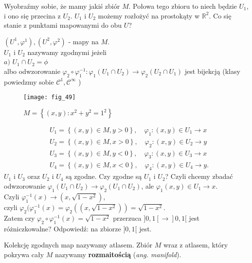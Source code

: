 \documentclass[../main.tex]{subfiles}
\begin{document}
Wyobraźmy sobie, że mamy jakiś zbiór $M$. Połowa tego zbioru to niech będzie $U_1$, i ono się przecina z $U_2$. $U_1$ i $U_2$ możemy rozłożyć na prostokąty w $\mathbb{R}^2$. Co się stanie z punktami mapowanymi do obu $U$?
\begin{definicja}
    $(U^1,\varphi^1), (U^2,\varphi^2)$ - mapy na $M$.\\
    $U_1$ i $U_2$ nazywamy zgodnymi jeżeli\\
    $a)$ $U_1\cap U_2 = \phi$\\
    albo odwzorowanie $\varphi_2 \circ \varphi_1^{-1}: \varphi_1(U_1\cap U_2)\to \varphi_2(U_2\cap U_1)$ jest bijekcją (klasy powiedzmy sobie $\mathcal{C}^1, \mathcal{C}^{\infty}$ )
\end{definicja}
    \begin{figure}[h]
        \centering
        \texttt{[image: fig\_49]}
        \caption{$M = \left\{ (x,y): x^2 + y^2 = 1^2 \right\}$}
    \end{figure}
\begin{przyklad}
    \begin{align*}
    &U_1 = \left\{ (x,y)\in M, y>0 \right\},\quad \varphi_1: (x,y)\in U_1 \to x\\
    &U_2 = \left\{ (x,y)\in M, x>0 \right\},\quad \varphi_2: (x,y)\in U_2 \to y\\
    &U_3 = \left\{ (x,y)\in M, y<0 \right\},\quad \varphi_3: (x,y)\in U_3 \to x\\
    &U_4 = \left\{ (x,y)\in M, x<0 \right\},\quad \varphi_4: (x,y)\in U_4 \to y
    .\end{align*}
    $U_1$ i $U_3$ oraz $U_2$ i $U_4$ są zgodne. Czy zgodne są $U_1$ i $U_2$? Czyli chcemy zbadać odwzorowanie $\varphi_1(U_1\cap U_2)\to \varphi_2(U_1\cap U_2)$, ale $\varphi_1(x,y)\in U_1\to x$.\\
    Czyli $\varphi_1^{-1}(x)\to \left( x, \sqrt{1-x^2}  \right) $,\\
    czyli $\varphi_2(\varphi_1^{-1}(x) = \varphi_2((x,\sqrt{1-x^2} )) = \sqrt{1-x^2} $.\\
    Zatem czy $\varphi_2 \circ \varphi_{1}^{-1}(x) = \sqrt{1-x^2} $ przerzuca $]0,1[\to]0,1[$ jest różniczkowalne? Odpowiedź: na zbiorze $]0,1[$ jest.
\end{przyklad}
\begin{definicja}
    Kolekcję zgodnych map nazywamy atlasem. Zbiór $M$ wraz z atlasem, który pokrywa cały $M$ nazywamy \textbf{rozmaitością} (\textit{ang. manifold}).
\end{definicja}
\end{document}
